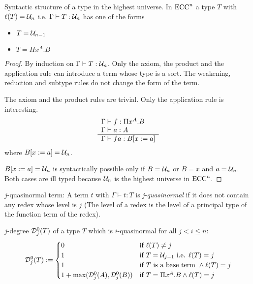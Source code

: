 \begin{lemma}
  Syntactic structure of a type in the highest universe.
  In $\text{ECC}^n$ a type $T$ with $\ell(T) = {\cal U}_n$ i.e. $\Gamma \vdash T :
  {\cal U}_n$ has one of the forms
  \begin{itemize}
  \item $T = {\cal U}_{n-1}$

  \item $T = \Pi x^A.B$
  \end{itemize}
  \begin{proof}
    By induction on $\Gamma \vdash T: {\cal U}_n$. Only the axiom, the product and
    the application rule can introduce a term whose type is a sort. The
    weakening, reduction and subtype rules do not change the form of the term.

    The axiom and the product rules are trivial. Only the application rule is
    interesting.
    $$
    \rulev
    {
      \Gamma \vdash f : \Pi x^A . B
      \\
      \Gamma \vdash a : A

    }
    {\Gamma \vdash f a : B [x:=a]}
    $$
    where $B [x:=a] = \uni_n$.

    $B [x:=a] = {\cal U}_n$ is syntactically possible only if $B = {\cal U}_n$ or $B =
    x$ and $a = {\cal U}_n$. Both cases are ill typed because
    ${\cal U}_n$ is the highest universe in $\text{ECC}^n$.

  \end{proof}
\end{lemma}



\begin{definition}
  $j$-quasinormal term:
  A term $t$ with $\Gamma \vdash t : T$ is \emph{j-quasinormal} if it does not
  contain any redex whose level is $j$ (The level of a redex is the level of
  a principal type of the function term of the redex).
\end{definition}

\begin{definition}
  $j$-degree ${\cal D}^0_j(T)$  of a type $T$ which is $i$-quasinormal for all
  $j < i \le n$:
  $$
  {\cal D}^0_j(T) :=
  \begin{cases}
    0 & \text{if } \ell(T) \not= j
    \\
    1 & \text{if } T = {\cal U}_{j-1} \text{ i.e. } \ell(T) = j
    \\
    1 & \text{if $T$ is a base term } \land \ell(T) = j
    \\
    1 + \text{max}({\cal D}^0_j(A), {\cal D}^0_j(B)) &
    \text{if } T = \Pi x^A.B \land \ell(T) = j
  \end{cases}
  $$
\end{definition}



